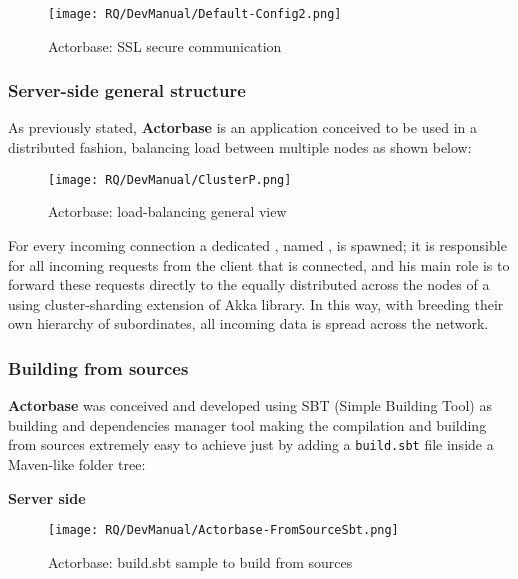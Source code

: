 \documentclass{scalatekids-article}
\begin{document}
\begin{figure}[H]
  \begin{center}
    \texttt{[image: RQ/DevManual/Default-Config2.png]}
    \caption{Actorbase: SSL secure communication}
  \end{center}
\end{figure}

\newpage
\subsubsection{Server-side general structure}

As previously stated, \textbf{Actorbase} is an application conceived to be used in a distributed fashion,
balancing load between multiple nodes as shown below:

\begin{figure}[H]
  \begin{center}
    \texttt{[image: RQ/DevManual/ClusterP.png]}
    \caption{Actorbase: load-balancing general view}
  \end{center}
\end{figure}

For every incoming connection a dedicated , named
, is spawned; it is responsible for all incoming requests
from the client that is connected, and his main role is to forward these
requests directly to the   equally distributed across
the nodes of a  using cluster-sharding extension of Akka library.
In this way, with   breeding their own hierarchy of
subordinates, all incoming data is spread across the  network.

\subsubsection{Building from sources}

\textbf{Actorbase} was conceived and developed using SBT (Simple Building Tool)
as building and dependencies manager tool making the compilation and building
from sources extremely easy to achieve just by adding a \verb=build.sbt= file
inside a Maven-like folder tree:

\textbf{Server side}

\begin{figure}[H]
  \begin{center}
    \texttt{[image: RQ/DevManual/Actorbase-FromSourceSbt.png]}
    \caption{Actorbase: build.sbt sample to build from sources}
  \end{center}
\end{figure}
\end{document}
